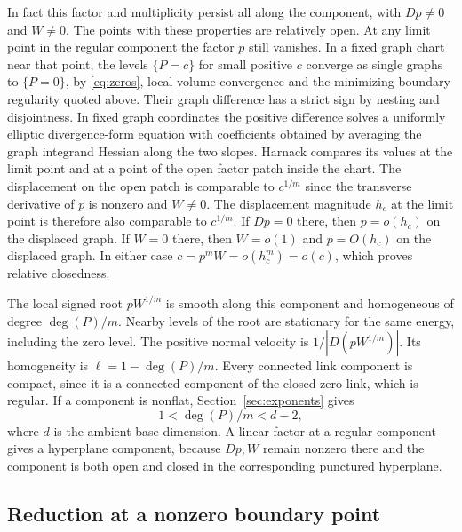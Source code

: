 \documentclass[11pt]{amsart}
\begin{document}
In fact this factor and multiplicity persist all along the component,
with \(Dp\ne0\) and \(W\ne0\). The points with these properties are
relatively open. At any limit point in the regular component the
factor \(p\) still vanishes. In a fixed graph chart near that point,
the levels \(\{P=c\}\) for small positive \(c\) converge as single
graphs to \(\{P=0\}\), by \eqref{eq:zeros}, local volume convergence and the
minimizing-boundary regularity quoted above. Their graph difference
has a strict sign by nesting and disjointness. In fixed graph
coordinates the positive difference solves a uniformly elliptic
divergence-form equation with coefficients obtained by averaging the
graph integrand Hessian along the two slopes. Harnack compares its
values at the limit point and at a point of the open factor patch
inside the chart. The displacement on the open patch is comparable
to \(c^{1/m}\) since the transverse derivative of \(p\) is nonzero
and \(W\ne0\). The displacement magnitude \(h_c\) at the limit point
is therefore also comparable to \(c^{1/m}\). If \(Dp=0\) there,
then \(p=o(h_c)\) on the displaced graph. If \(W=0\) there, then
\(W=o(1)\) and \(p=O(h_c)\) on the displaced graph. In either
case \(c=p^m W=o(h_c^m)=o(c)\), which proves relative closedness.

The local signed root \(p W^{1/m}\) is smooth along this component
and homogeneous of degree \(\deg(P)/m\). Nearby levels of the root
are stationary for the same energy, including the zero level.
The positive normal velocity is \(1/|D(pW^{1/m})|\). Its homogeneity
is \(\ell=1-\deg(P)/m\). Every connected link component is compact,
since it is a connected component of the closed zero link, which
is regular. If a component is nonflat, Section~\ref{sec:exponents} gives
\begin{equation}\label{eq:degree-bounds}
 1<\deg(P)/m<d-2,
\end{equation}
where \(d\) is the ambient base dimension. A linear factor at a
regular component gives a hyperplane component, because \(Dp,W\)
remain nonzero there and the component is both open and closed
in the corresponding punctured hyperplane.

\subsection{Reduction at a nonzero boundary point}
\end{document}
